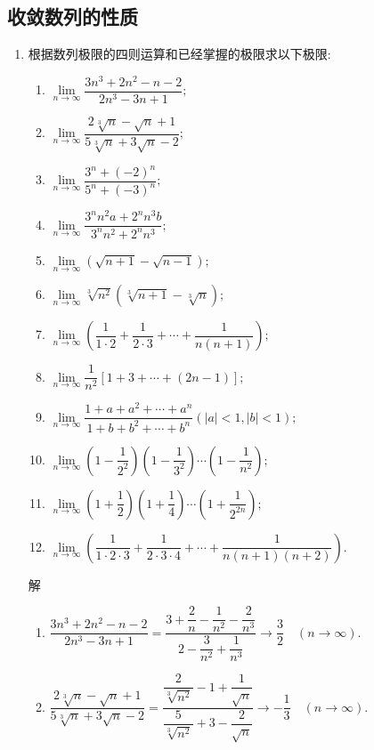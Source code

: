 \documentclass[UTF8,a4paper,20pt]{article}
\begin{document}
\subsection{收敛数列的性质}
\begin{enumerate}
\item {\large\kaishu 根据数列极限的四则运算和已经掌握的极限求以下极限:}
	\begin{enumerate}[(1)]
	\item $\lim\limits_{n \to \infty}\dfrac{3n^3+2n^2-n-2}{2n^3-3n+1};$
	\item $\lim\limits_{n \to \infty}\dfrac{2\sqrt[3]{n}-\sqrt{n}+1}{5\sqrt[3]{n}+3\sqrt{n}-2};$
	\item $\lim\limits_{n \to \infty}\dfrac{3^n+(-2)^n}{5^n+(-3)^n};$
	\item $\lim\limits_{n \to \infty}\dfrac{3^nn^2a+2^nn^3b}{3^nn^2+2^nn^3};$
	\item $\lim\limits_{n \to \infty}(\sqrt{n+1}-\sqrt{n-1});$
	\item $\lim\limits_{n \to \infty}\sqrt[3]{n^2}(\sqrt[3]{n+1}-\sqrt[3]{n});$
	\item $\lim\limits_{n \to \infty}\left(\dfrac{1}{1\cdot 2}+\dfrac{1}{2\cdot 3}+\cdots+\dfrac{1}{n(n+1)}\right);$
	\item $\lim\limits_{n \to \infty}\dfrac{1}{n^2}[1+3+\cdots+(2n-1)];$
	\item $\lim\limits_{n \to \infty}\dfrac{1+a+a^2+\cdots+a^n}{1+b+b^2+\cdots+b^n} (|a|<1, |b|<1);$
	\item $\lim\limits_{n \to \infty}\left(1-\dfrac{1}{2^2}\right)\left(1-\dfrac{1}{3^2}\right)\cdots\left(1-\dfrac{1}{n^2}\right);$
	\item $\lim\limits_{n \to \infty}\left(1+\dfrac{1}{2}\right)\left(1+\dfrac{1}{4}\right)\cdots\left(1+\dfrac{1}{2^{2n}}\right);$
	\item $\lim\limits_{n \to \infty}\left(\dfrac{1}{1\cdot 2\cdot 3}+\dfrac{1}{2\cdot 3\cdot 4}+\cdots+\dfrac{1}{n(n+1)(n+2)}\right).$
	\end{enumerate}
{\heiti 解} 
	\begin{enumerate}[(1)]
	\item $\dfrac{3n^3+2n^2-n-2}{2n^3-3n+1}=\dfrac{3+\dfrac{2}{n}-\dfrac{1}{n^2}-\dfrac{2}{n^3}}{2-\dfrac{3}{n^2}+\dfrac{1}{n^3}}\to \dfrac{3}{2}\quad(n \to \infty).$
	\item $\dfrac{2\sqrt[3]{n}-\sqrt{n}+1}{5\sqrt[3]{n}+3\sqrt{n}-2}=\dfrac{\dfrac{2}{\sqrt[3]{n^2}}-1+\dfrac{1}{\sqrt{n}}}{\dfrac{5}{\sqrt[3]{n^2}}+3-\dfrac{2}{\sqrt{n}}}\to -\dfrac{1}{3}\quad(n\to\infty).$

\end{enumerate}
\end{enumerate}
\end{document}
